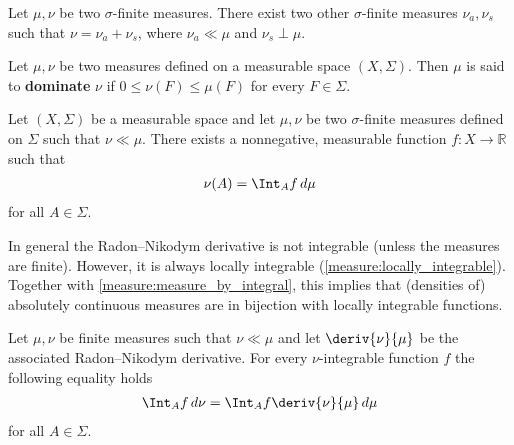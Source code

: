     \begin{theorem}
        Let $\mu,\nu$ be two $\sigma$-finite measures. There exist two other $\sigma$-finite measures $\nu_a,\nu_s$ such that $\nu=\nu_a+\nu_s$, where $\nu_a\ll\mu$ and $\nu_s\perp\mu$.
    \end{theorem}

    \begin{definition}
        Let $\mu,\nu$ be two measures defined on a measurable space $(X,\Sigma)$. Then $\mu$ is said to \textbf{dominate} $\nu$ if $0\leq\nu(F)\leq\mu(F)$ for every $F\in\Sigma$.
    \end{definition}

    \begin{theorem}\label{measure:radon_nikodym}
        Let $(X,\Sigma)$ be a measurable space and let $\mu,\nu$ be two $\sigma$-finite measures defined on $\Sigma$ such that $\nu\ll\mu$. There exists a nonnegative, measurable function $f:X\rightarrow\mathbb{R}$ such that
        \begin{gather}
            \nu(A) = \Int_Af\,d\mu
        \end{gather}
        for all $A\in\Sigma$.
    \end{theorem}

    \begin{property}[Integrability]
        In general the Radon--Nikodym derivative is not integrable (unless the measures are finite). However, it is always locally integrable (\cref{measure:locally_integrable}). Together with \cref{measure:measure_by_integral}, this implies that (densities of) absolutely continuous measures are in bijection with locally integrable functions.
    \end{property}

    \begin{property}
        Let $\mu,\nu$ be finite measures such that $\nu\ll\mu$ and let $\deriv{\nu}{\mu}$ be the associated Radon--Nikodym derivative. For every $\nu$-integrable function $f$ the following equality holds
        \begin{gather}
            \Int_A f\,d\nu = \Int_Af\deriv{\nu}{\mu}\,d\mu
        \end{gather}
        for all $A\in\Sigma$.
    \end{property}

